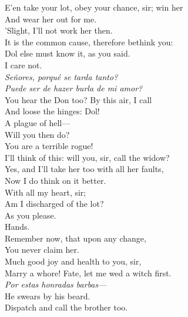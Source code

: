 \documentclass[a4paper,oneside,12pt]{memoir}
\begin{document}
\begin{drama*}
E'en take your lot, obey your chance, sir; win her\\
And wear her out for me.\\
\subtlespeaks {} 'Slight, I'll not work her then.\\
\facespeaks It is the common cause, therefore bethink you:\\
Dol else must know it, as you said.\\
\subtlespeaks {} I care not.\\
\surlyspeaks \emph{Se\~{n}ores, porqu\'{e} se tarda tanto?\\
Puede ser de hazer burla de mi amor?}\\
\facespeaks You hear the Don too? By this air, I call\\
And loose the hinges: Dol!\\
\subtlespeaks {} A plague of hell---\\
\facespeaks Will you then do?\\
\subtlespeaks {} You are a terrible rogue!\\
I'll think of this: will you, sir, call the widow?\\
\facespeaks Yes, and I'll take her too with all her faults,\\
Now I do think on it better.\\
\subtlespeaks {} With all my heart, sir;\\
Am I discharged of the lot?\\
\facespeaks {} As you please.\\
\subtlespeaks {} Hands.\\
\facespeaks Remember now, that upon any change,\\
You never claim her.\\
\subtlespeaks {} Much good joy and health to you, sir,\\
Marry a whore! Fate, let me wed a witch first.\\
\surlyspeaks \emph{Por estas honradas barbas---}\\
\subtlespeaks {} He swears by his beard.\\
Dispatch and call the brother too.\\

\end{drama*}
\end{document}
